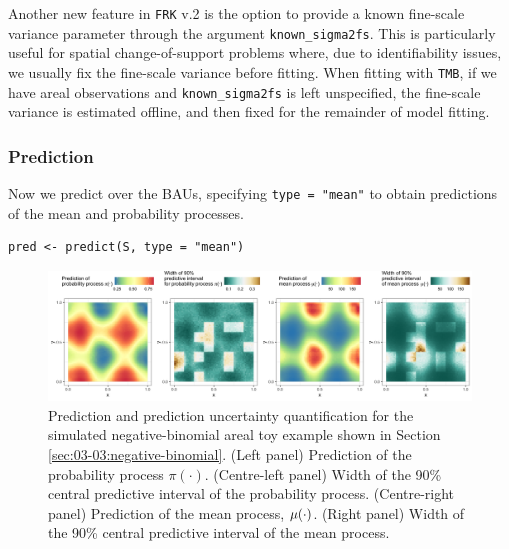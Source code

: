 \documentclass[12pt,a4paper]{article}
\begin{document}
Another new feature in \texttt{FRK} v.2 is the option to provide a known fine-scale variance parameter through the argument \texttt{known\_sigma2fs}.
This is particularly useful for spatial change-of-support problems where, due to identifiability issues, we usually fix the fine-scale variance before fitting.
When fitting with \texttt{TMB}, if we have areal observations and \mbox{\texttt{known\_sigma2fs}} is left unspecified, the fine-scale variance is estimated offline, and then fixed for the remainder of model fitting. 



\subsubsection{Prediction}

Now we predict over the BAUs, specifying \texttt{type = "mean"} to obtain predictions of the mean and probability processes. 

\begin{minipage}{\linewidth}
\begin{lstlisting}[style=R]
pred <- predict(S, type = "mean")
\end{lstlisting}
\end{minipage}

\begin{figure}[t!]
    \centering
    \includegraphics[width = \linewidth]{Images/03-02-negative_binomial_spatialCOS.png}
    \caption{Prediction and prediction uncertainty quantification for the simulated negative-binomial areal toy example shown in Section \ref{sec:03-03:negative-binomial}. (Left panel) Prediction of the probability process $\pi(\cdot)$. (Centre-left panel) Width of the 90\% central predictive interval of the probability process. (Centre-right panel) Prediction of the mean process, $\mu(\cdot)$. (Right panel) Width of the 90\% central predictive interval of the mean process.
}   
  \label{fig:03-02-negative-binomial}
\end{figure}
\end{document}
